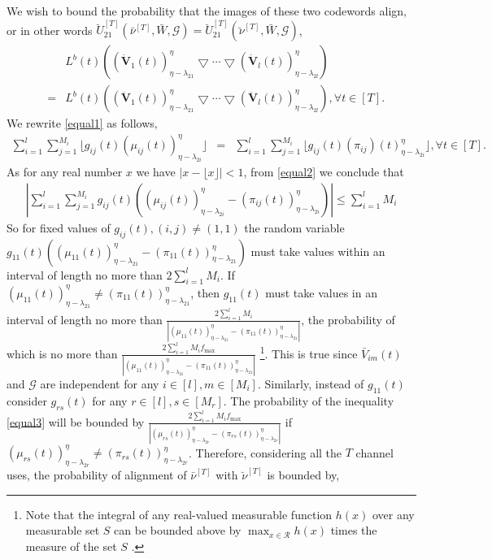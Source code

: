 \documentclass[11pt]{article}
\begin{document}
We wish to bound the probability that the images of these two codewords align, or in other words 
$\breve{U}_{21}^{[T]}(\bar{\nu}^{[T]},\bar{W},\mathcal{G})=\breve{U}_{21}^{[T]}(\breve{\nu}^{[T]},\bar{W},\mathcal{G})$,
\begin{eqnarray}
 &&L^b(t)\left((\dot{\mathbf{V}}_1(t))^{\eta}_{\eta-\lambda_{21}}\bigtriangledown\cdots\bigtriangledown(\dot{\mathbf{V}}_l(t))^{\eta}_{\eta-\lambda_{2l}}\right)\nonumber\\
 &=&L^b(t)\left((\ddot{\mathbf{V}}_1(t))^{\eta}_{\eta-\lambda_{21}}\bigtriangledown\cdots\bigtriangledown(\ddot{\mathbf{V}}_l(t))^{\eta}_{\eta-\lambda_{2l}}\right), \forall t\in[T].\label{equal1}
\end{eqnarray}
We rewrite \eqref{equal1} as follows,
\begin{eqnarray}
\sum_{i=1}^l\sum_{j=1}^{M_i}\lfloor g_{ij} (t)(\mu_{ij}(t))_{\eta-\lambda_{2i}}^{\eta}\rfloor &=&
\sum_{i=1}^l\sum_{j=1}^{M_i}\lfloor g_{ij}(t) (\pi_{ij})(t)_{\eta-\lambda_{2i}}^{\eta}\rfloor\label{equal2}, \forall t\in[T].
\end{eqnarray}
As for any real number $x$ we have $|x-\lfloor x\rfloor|<1$, from \eqref{equal2}  we conclude that
\begin{eqnarray}
\left|\sum_{i=1}^l\sum_{j=1}^{M_i}g_{ij}(t) \left( (\mu_{ij}(t))_{\eta-\lambda_{2i}}^{\eta}- (\pi_{ij}(t))_{\eta-\lambda_{2i}}^{\eta}\right)\right|\le \sum_{i=1}^lM_i \label{equal3}
\end{eqnarray}
So for fixed values of $g_{ij}(t),(i,j)\neq (1,1)$ the random variable $g_{11}(t)  \left( (\mu_{11}(t))_{\eta-\lambda_{21}}^{\eta}- (\pi_{11}(t))_{\eta-\lambda_{21}}^{\eta}\right)$ must take values within an interval of length no more than $2\sum_{i=1}^lM_i$. If $(\mu_{11}(t))_{\eta-\lambda_{21}}^{\eta}\neq (\pi_{11}(t))_{\eta-\lambda_{21}}^{\eta}$, then $g_{11}(t)$ must take values in an interval of length no more than $\frac{2\sum_{i=1}^lM_i}{\left|(\mu_{11}(t))_{\eta-\lambda_{21}}^{\eta}- (\pi_{11}(t))_{\eta-\lambda_{21}}^{\eta}\right|}$, the probability of which is no more than $\frac{2\sum_{i=1}^lM_if_{\max}}{\left|(\mu_{11}(t))_{\eta-\lambda_{21}}^{\eta}- (\pi_{11}(t))_{\eta-\lambda_{21}}^{\eta}\right|}$ \footnote{Note that the integral of any real-valued measurable function $h(x)$ over any measurable set $S$ can be bounded above by $\max_{x\in \mathcal {R}}h(x)$ times the measure of the set $S$ \cite{stein}.}. This is true since $\bar{V}_{im}(t)$ and $\mathcal{G}$ are independent  for any $i\in[l],m\in[M_i]$. Similarly, instead of $g_{11}(t)$ consider $g_{rs}(t)$ for any $r\in[l],s\in[M_r]$. The probability of the inequality \eqref{equal3} will be bounded by $\frac{2\sum_{i=1}^lM_if_{\max}}{\left|(\mu_{rs}(t))_{\eta-\lambda_{2r}}^{\eta}- (\pi_{rs}(t))_{\eta-\lambda_{2r}}^{\eta}\right|}$ if $(\mu_{rs}(t))_{\eta-\lambda_{2r}}^{\eta}\neq (\pi_{rs}(t))_{\eta-\lambda_{2r}}^{\eta}$. Therefore, considering all the $T$ channel uses, the probability of alignment of $\bar{\nu}^{[T]}$ with $\breve{\nu}^{[T]}$ is bounded by,
\end{document}

